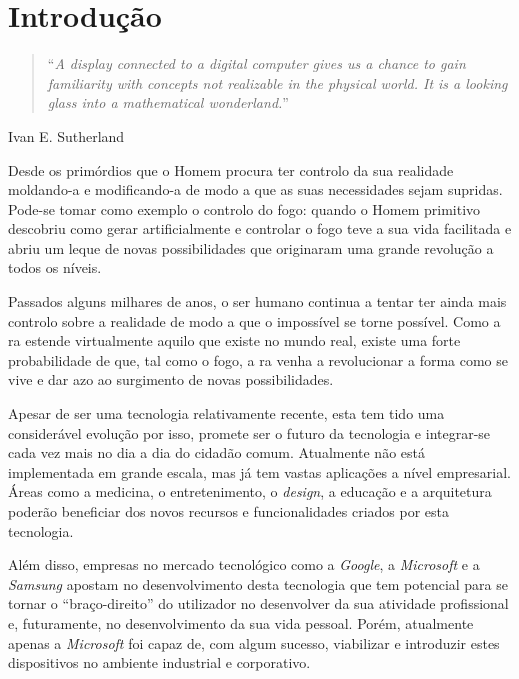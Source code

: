 \documentclass{report}
\begin{document}
\tableofcontents
\listoffigures
\listoftables

\clearpage
{}

\chapter{Introdução}
\label{chap.introducao}


\begin{quote}
    ``\emph{A display connected to a digital computer gives us a chance to gain familiarity with concepts not realizable in the physical world. It is a looking glass into a mathematical wonderland.}''\cite{Sutherland65theultimate}
\end{quote}
\begin{flushright}
Ivan E. Sutherland
\end{flushright}

Desde os primórdios que o Homem procura ter controlo da sua realidade moldando-a e modificando-a de modo a que as suas necessidades sejam supridas. Pode-se tomar como exemplo o controlo do fogo: quando o Homem primitivo descobriu como gerar artificialmente e controlar o fogo teve a sua vida facilitada e abriu um leque de novas possibilidades que originaram uma grande revolução a todos os níveis.

Passados alguns milhares de anos, o ser humano continua a tentar ter ainda mais controlo sobre a realidade de modo a que o impossível se torne possível. Como a \ac{ra} estende virtualmente aquilo que existe no mundo real, existe uma forte probabilidade de que, tal como o fogo, a \ac{ra} venha a revolucionar a forma como se vive e dar azo ao surgimento de novas possibilidades.

Apesar de ser uma tecnologia relativamente recente, esta tem tido uma considerável evolução por isso, promete ser o futuro da tecnologia e integrar-se cada vez mais no dia a dia do cidadão comum. Atualmente não está implementada em grande escala, mas já tem vastas aplicações a nível empresarial. Áreas como a medicina, o entretenimento, o \textit{design}, a educação e a arquitetura poderão beneficiar dos novos recursos e funcionalidades criados por esta tecnologia.

Além disso, empresas no mercado tecnológico como a \textit{Google}, a \textit{Microsoft} e a \textit{Samsung} apostam no desenvolvimento desta tecnologia que tem potencial para se tornar o “braço-direito” do utilizador no desenvolver da sua atividade profissional e, futuramente, no desenvolvimento da sua vida pessoal. Porém, atualmente apenas a \textit{Microsoft} foi capaz de, com algum sucesso, viabilizar e introduzir estes dispositivos no ambiente industrial e corporativo.
\end{document}
